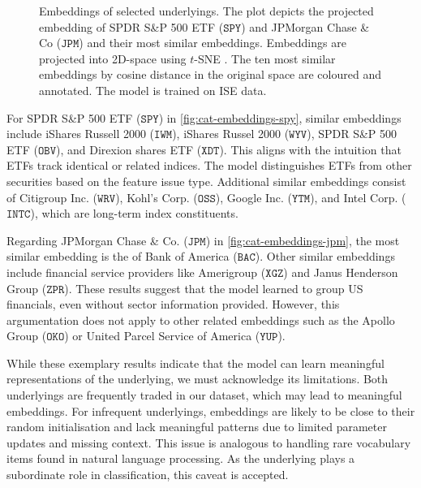 \begin{figure}[h!]
    \vfill
    \caption[Embeddings of Selected Underlyings]{Embeddings of selected underlyings. The plot depicts the projected embedding of SPDR S\&P 500 ETF ($\mathtt{SPY}$) and JPMorgan Chase \& Co ($\mathtt{JPM}$) and their most similar embeddings. Embeddings are projected into 2D-space using $t$-SNE \autocite[][2587]{vandermaatenVisualizingDataUsing2008}. The ten most similar embeddings by cosine distance in the original space are coloured and annotated. The model is trained on \gls{ISE} data.}
    \label{fig:categorical-embeddings}
\end{figure}

For SPDR S\&P 500 ETF ($\mathtt{SPY}$) in \cref{fig:cat-embeddings-spy}, similar embeddings include iShares Russell 2000 ($\mathtt{IWM}$), iShares Russel 2000 ($\mathtt{WYV}$), SPDR S\&P 500 ETF ($\mathtt{OBV}$), and Direxion shares ETF ($\mathtt{XDT}$). This aligns with the intuition that \glspl{ETF} track identical or related indices. The model distinguishes \glspl{ETF} from other securities based on the feature issue type. Additional similar embeddings consist of Citigroup Inc. ($\mathtt{WRV}$), Kohl's Corp. ($\mathtt{OSS}$), Google Inc. ($\mathtt{YTM}$), and Intel Corp. ($\mathtt{INTC}$), which are long-term index constituents.

Regarding JPMorgan Chase \& Co. ($\mathtt{JPM}$) in \cref{fig:cat-embeddings-jpm}, the most similar embedding is the of Bank of America ($\mathtt{BAC}$). Other similar embeddings include financial service providers like Amerigroup ($\mathtt{XGZ}$) and Janus Henderson Group ($\mathtt{ZPR}$). These results suggest that the model learned to group US financials, even without sector information provided. However, this argumentation does not apply to other related embeddings such as the Apollo Group ($\mathtt{OKO}$) or United Parcel Service of America ($\mathtt{YUP}$). %

While these exemplary results indicate that the model can learn meaningful representations of the underlying, we must acknowledge its limitations. Both underlyings are frequently traded in our dataset, which may lead to meaningful embeddings. For infrequent underlyings, embeddings are likely to be close to their random initialisation and lack meaningful patterns due to limited parameter updates and missing context. This issue is analogous to handling rare vocabulary items found in natural language processing. As the underlying plays a subordinate role in classification, this caveat is accepted.


